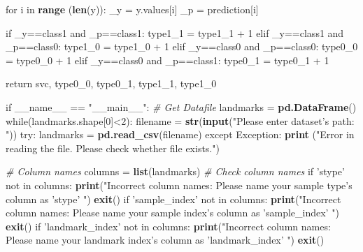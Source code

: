 \documentclass[10pt,letterpaper]{article}
\newenvironment{Shaded}{\begin{snugshade}}{\end{snugshade}}
\newcommand{\KeywordTok}[1]{\textcolor[rgb]{0.13,0.29,0.53}{\textbf{#1}}}
\newcommand{\DecValTok}[1]{\textcolor[rgb]{0.00,0.00,0.81}{#1}}
\newcommand{\StringTok}[1]{\textcolor[rgb]{0.31,0.60,0.02}{#1}}
\newcommand{\CommentTok}[1]{\textcolor[rgb]{0.56,0.35,0.01}{\textit{#1}}}
\newcommand{\NormalTok}[1]{#1}
\begin{document}
\begin{Shaded}
\begin{Highlighting}[]
    \NormalTok{for i in }\KeywordTok{range} \NormalTok{(}\KeywordTok{len}\NormalTok{(y)):}
\StringTok{        }\NormalTok{_y =}\StringTok{ }\NormalTok{y.values[i]}
        \NormalTok{_p =}\StringTok{ }\NormalTok{prediction[i]}

        \NormalTok{if _y==class1 and _p==class1:}
\StringTok{            }\NormalTok{type1_1 =}\StringTok{ }\NormalTok{type1_1 +}\StringTok{ }\DecValTok{1}
        \NormalTok{elif _y==class1 and _p==class0:}
\StringTok{            }\NormalTok{type1_0 =}\StringTok{ }\NormalTok{type1_0 +}\StringTok{ }\DecValTok{1}
        \NormalTok{elif _y==class0 and _p==class0:}
\StringTok{            }\NormalTok{type0_0 =}\StringTok{ }\NormalTok{type0_0 +}\StringTok{ }\DecValTok{1}
        \NormalTok{elif _y==class0 and _p==class1:}
\StringTok{            }\NormalTok{type0_1 =}\StringTok{ }\NormalTok{type0_1 +}\StringTok{ }\DecValTok{1}
    
    \NormalTok{return svc, type0_0, type0_1, type1_1, type1_0}


\NormalTok{if __name__ ==}\StringTok{ "__main__"}\NormalTok{:}
\StringTok{    }\CommentTok{# Get Datafile}
\StringTok{    }\NormalTok{landmarks =}\StringTok{ }\KeywordTok{pd.DataFrame}\NormalTok{()}
    \NormalTok{while(landmarks.shape[}\DecValTok{0}\NormalTok{]<}\DecValTok{2}\NormalTok{):}
\StringTok{        }\NormalTok{filename =}\StringTok{ }\KeywordTok{str}\NormalTok{(}\KeywordTok{input}\NormalTok{(}\StringTok{"Please enter dataset's path: "}\NormalTok{))}
        \NormalTok{try:}
\StringTok{            }\NormalTok{landmarks =}\StringTok{ }\KeywordTok{pd.read_csv}\NormalTok{(filename)}
        \NormalTok{except Exception:}
\StringTok{            }\KeywordTok{print} \NormalTok{(}\StringTok{"Error in reading the file.}
\StringTok{                Please check whether file exists."}\NormalTok{)}

    \CommentTok{# Column names}
    \NormalTok{columns =}\StringTok{ }\KeywordTok{list}\NormalTok{(landmarks)}
    \CommentTok{# Check column names}
    \NormalTok{if }\StringTok{'stype'} \NormalTok{not in columns:}
\StringTok{        }\KeywordTok{print}\NormalTok{(}\StringTok{"Incorrect column names: Please}
\StringTok{            name your sample type's column as 'stype' "}\NormalTok{)}
        \KeywordTok{exit}\NormalTok{()}
    \NormalTok{if }\StringTok{'sample_index'} \NormalTok{not in columns:}
\StringTok{        }\KeywordTok{print}\NormalTok{(}\StringTok{"Incorrect column names: Please name your}
\StringTok{            sample index's column as 'sample_index' "}\NormalTok{)}
        \KeywordTok{exit}\NormalTok{()}
    \NormalTok{if }\StringTok{'landmark_index'} \NormalTok{not in columns:}
\StringTok{        }\KeywordTok{print}\NormalTok{(}\StringTok{"Incorrect column names: Please name your}
\StringTok{            landmark index's column as 'landmark_index' "}\NormalTok{)}
        \KeywordTok{exit}\NormalTok{()}


\end{Highlighting}
\end{Shaded}
\end{document}
